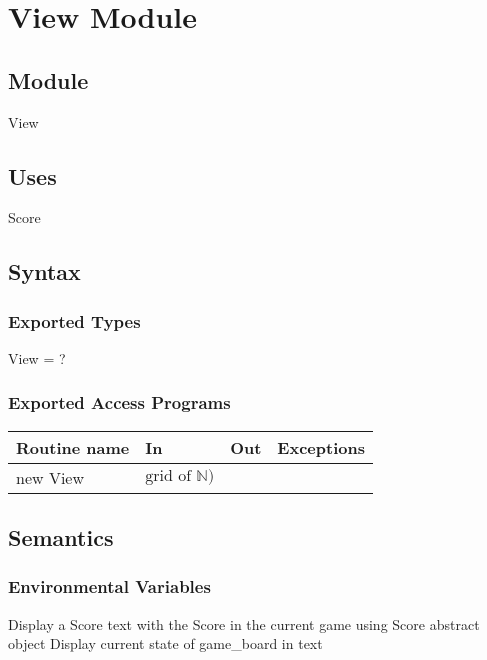 \documentclass[12pt]{article}
\begin{document}
\newpage

\section* {View Module}

\subsection* {Module}

View

\subsection* {Uses}

Score

\subsection* {Syntax}

\subsubsection* {Exported Types}

View = ?

\subsubsection* {Exported Access Programs}

\begin{tabular}{| l | l | l | l |}
\hline
\textbf{Routine name} & \textbf{In} & \textbf{Out} & \textbf{Exceptions}\\
\hline
new View & $\text{grid of } \mathbb{N})$ & & \\
\hline

\end{tabular}

\subsection* {Semantics}

\subsubsection* {Environmental Variables}

Display a Score text with the Score in the current game using Score abstract object
Display current state of game\_board in text
\end{document}
